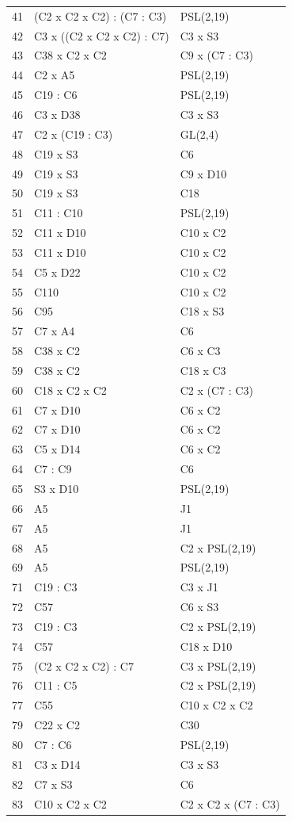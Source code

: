 \documentclass[10pt,a4paper]{article}
\begin{document}
\begin{longtable}{r p{77mm} p{53mm}}
41&(C2 x C2 x C2) : (C7 : C3)&PSL(2,19)\\
42&C3 x ((C2 x C2 x C2) : C7)&C3 x S3\\
43&C38 x C2 x C2&C9 x (C7 : C3)\\
44&C2 x A5&PSL(2,19)\\
45&C19 : C6&PSL(2,19)\\
46&C3 x D38&C3 x S3\\
47&C2 x (C19 : C3)&GL(2,4)\\
48&C19 x S3&C6\\
49&C19 x S3&C9 x D10\\
50&C19 x S3&C18\\
51&C11 : C10&PSL(2,19)\\
52&C11 x D10&C10 x C2\\
53&C11 x D10&C10 x C2\\
54&C5 x D22&C10 x C2\\
55&C110&C10 x C2\\
56&C95&C18 x S3\\
57&C7 x A4&C6\\
58&C38 x C2&C6 x C3\\
59&C38 x C2&C18 x C3\\
60&C18 x C2 x C2&C2 x (C7 : C3)\\
61&C7 x D10&C6 x C2\\
62&C7 x D10&C6 x C2\\
63&C5 x D14&C6 x C2\\
64&C7 : C9&C6\\
65&S3 x D10&PSL(2,19)\\
66&A5&J1\\
67&A5&J1\\
68&A5&C2 x PSL(2,19)\\
69&A5&PSL(2,19)\\
71&C19 : C3&C3 x J1\\
72&C57&C6 x S3\\
73&C19 : C3&C2 x PSL(2,19)\\
74&C57&C18 x D10\\
75&(C2 x C2 x C2) : C7&C3 x PSL(2,19)\\
76&C11 : C5&C2 x PSL(2,19)\\
77&C55&C10 x C2 x C2\\
79&C22 x C2&C30\\
80&C7 : C6&PSL(2,19)\\
81&C3 x D14&C3 x S3\\
82&C7 x S3&C6\\
83&C10 x C2 x C2&C2 x C2 x (C7 : C3)\\

\end{longtable}
\end{document}

